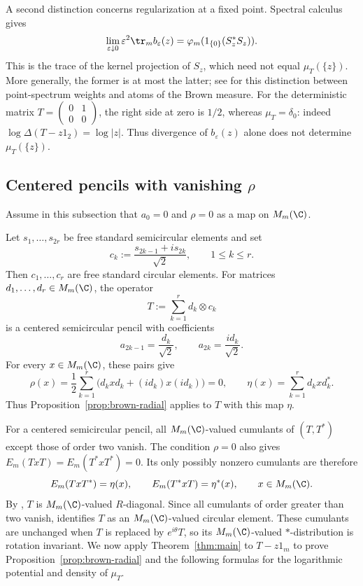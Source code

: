 A second distinction concerns regularization at a fixed point.
Spectral calculus gives
\begin{equation}\label{eq:brown-kernel-limit}
 \lim_{\varepsilon\downarrow0}\varepsilon^2
               \tr_m b_\varepsilon(z)
   =\varphi_m(1_{\{0\}}(S_z^*S_z)).
\end{equation}
This is the trace of the kernel projection of $S_z$, which need not equal $\mu_T(\{z\})$.
More generally, the former is at most the latter; see \cite[Section~2.1, p.~12]{ACSY24} for this distinction between point-spectrum weights and atoms of the Brown measure.
For the deterministic matrix $T=\left(\begin{smallmatrix}0&1\\0&0\end{smallmatrix}\right)$, the right side at zero is $1/2$, whereas $\mu_T=\delta_0$: indeed $\log\Delta(T-z1_2)=\log|z|$.
Thus divergence of $b_\varepsilon(z)$ alone does not determine $\mu_T(\{z\})$.

\subsection{Centered pencils with vanishing \texorpdfstring{$\rho$}{rho}}
\label{subsec:brown-radial}
Assume in this subsection that $a_0=0$ and $\rho=0$ as a map on $M_m(\C)$.

\begin{example}
\label{ex:brown-circular-coefficients}
Let $s_1,\ldots,s_{2r}$ be free standard semicircular elements and set
\[
 c_k:=\frac{s_{2k-1}+is_{2k}}{\sqrt2},\qquad 1\le k\le r.
\]
Then $c_1,\ldots,c_r$ are free standard circular elements.
For matrices $d_1,\ldots,d_r\in M_m(\C)$, the operator
\[
 T:=\sum_{k=1}^r d_k\otimes c_k
\]
is a centered semicircular pencil with coefficients
\[
 a_{2k-1}=\frac{d_k}{\sqrt2},\qquad
 a_{2k}=\frac{id_k}{\sqrt2}.
\]
For every $x\in M_m(\C)$, these pairs give
\[
 \rho(x)=\frac12\sum_{k=1}^r
           \bigl(d_kxd_k+(id_k)x(id_k)\bigr)=0,
 \qquad
 \eta(x)=\sum_{k=1}^r d_kxd_k^*.
\]
Thus Proposition~\ref{prop:brown-radial} applies to $T$ with this map $\eta$.
\end{example}

For a centered semicircular pencil, all $M_m(\C)$-valued cumulants of $(T,T^*)$ except those of order two vanish.
The condition $\rho=0$ also gives $E_m(TxT)=E_m(T^*xT^*)=0$.
Its only possibly nonzero cumulants are therefore
\[
 E_m(TxT^*)=\eta(x),\qquad E_m(T^*xT)=\eta^*(x),
 \qquad x\in M_m(\C).
\]
By \cite[Theorem 2.9(b)]{DG24}, $T$ is $M_m(\C)$-valued $R$-diagonal.
Since all cumulants of order greater than two vanish, \cite[Definition 2.10]{DG24} identifies $T$ as an $M_m(\C)$-valued circular element.
These cumulants are unchanged when $T$ is replaced by $e^{i\theta}T$, so its $M_m(\C)$-valued $*$-distribution is rotation invariant.
We now apply Theorem~\ref{thm:main} to $T-z1_m$ to prove Proposition~\ref{prop:brown-radial} and the following formulas for the logarithmic potential and density of $\mu_T$.

